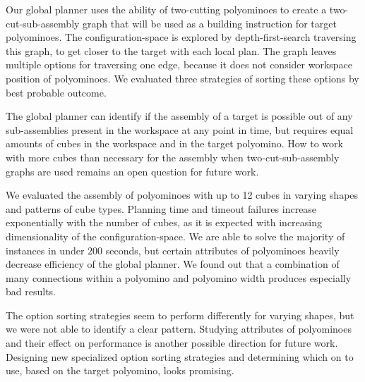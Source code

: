 Our global planner uses the ability of two-cutting polyominoes to create a two-cut-sub-assembly graph that will be used as a building instruction for target polyominoes.
The configuration-space is explored by depth-first-search traversing this graph, to get closer to the target with each local plan.
The graph leaves multiple options for traversing one edge, because it does not consider workspace position of polyominoes. 
We evaluated three strategies of sorting these options by best probable outcome.

The global planner can identify if the assembly of a target is possible out of any sub-assemblies present in the workspace at any point in time, but requires equal amounts of cubes in the workspace and in the target polyomino.
How to work with more cubes than necessary for the assembly when two-cut-sub-assembly graphs are used remains an open question for future work.

We evaluated the assembly of polyominoes with up to 12 cubes in varying shapes and patterns of cube types.
Planning time and timeout failures increase exponentially with the number of cubes, as it is expected with increasing dimensionality of the configuration-space.
We are able to solve the majority of instances in under $200$ seconds, but certain attributes of polyominoes heavily decrease efficiency of the global planner.
We found out that a combination of many connections within a polyomino and polyomino width produces especially bad results.

The option sorting strategies seem to perform differently for varying shapes, but we were not able to identify a clear pattern.
Studying attributes of polyominoes and their effect on performance is another possible direction for future work.
Designing new specialized option sorting strategies and determining which on to use, based on the target polyomino, looks promising. 


